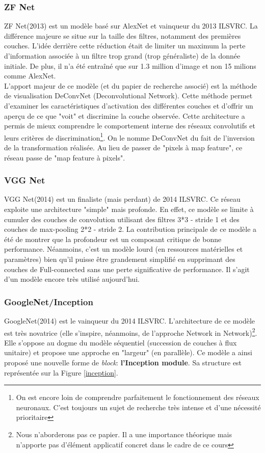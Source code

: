 \subsubsection{ZF Net}
ZF Net\cite{zfnet}(2013) est un modèle basé sur AlexNet et vainqueur du 2013 ILSVRC. La différence majeure se situe sur la taille des filtres, notamment des premières couches. L'idée derrière cette réduction était de limiter un maximum la perte d'information associée à un filtre trop grand (trop généraliste) de la donnée initiale. De plus, il n'a été entraîné que sur 1.3 million d'image et non 15 milions comme AlexNet.\\

\noindent L'apport majeur de ce modèle (et du papier de recherche associé) est la méthode de visualisation DeConvNet (Deconvolutional Network). Cette méthode permet d'examiner les caractéristiques d'activation des différentes couches et d'offrir un aperçu de ce que "voit" et discrimine la couche observée. Cette architecture a permis de mieux comprendre le comportement interne des réseaux convolutifs et leurs critères de discrimination\footnote{On est encore loin de comprendre parfaitement le fonctionnement des réseaux neuronaux. C'est toujours un sujet de recherche très intense et d'une nécessité prioritaire}. On le nomme DeConvNet du fait de l'inversion de la transformation réalisée. Au lieu de passer de "pixels à map feature", ce réseau passe de "map feature à pixels".

\subsubsection{VGG Net}
VGG Net\cite{vggnet}(2014) est un finaliste (mais perdant) de 2014 ILSVRC. Ce réseau exploite une architecture "simple" mais profonde. En effet, ce modèle se limite à cumuler des couches de convolution utilisant des filtres 3*3 - stride 1 et des couches de max-pooling 2*2 - stride 2. La contribution principale de ce modèle a été de montrer que la profondeur est un composant critique de bonne performance. Néanmoins, c'est un modèle lourd (en ressources matérielles et paramètres) bien qu'il puisse être grandement simplifié en supprimant des couches de Full-connected sans une perte significative de performance. Il s'agit d'un modèle encore très utilisé aujourd'hui.

\subsubsection{GoogleNet/Inception}
GoogleNet\cite{googlenet}(2014) est le vainqueur du 2014 ILSVRC. L'architecture de ce modèle est très novatrice (elle s'inspire, néanmoins, de l'approche Network in Network\cite{nin})\footnote{Nous n'aborderons pas ce papier. Il a une importance théorique mais n'apporte pas d'élément applicatif concret dans le cadre de ce cours}. Elle s'oppose au dogme du modèle séquentiel (succession de couches à flux unitaire) et propose une approche en "largeur" (en parallèle). Ce modèle a ainsi proposé une nouvelle forme de \textit{block}: \textbf{l'Inception module}. Sa structure est représentée sur la Figure \ref{inception}.\\

